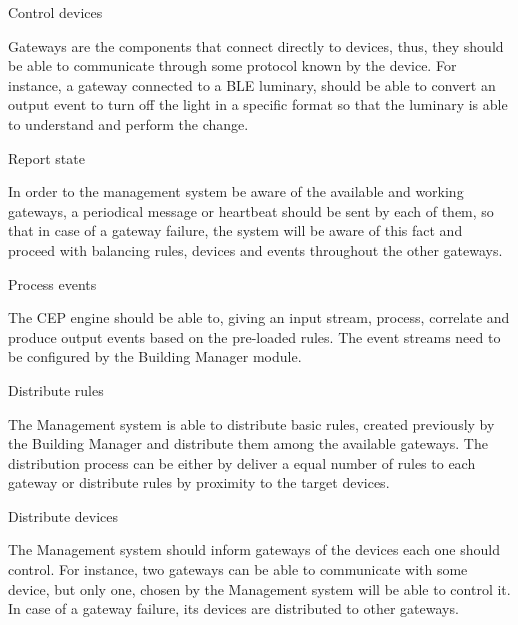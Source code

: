 \begin{Paragraph}{Control devices}
	
Gateways are the components that connect directly to devices, thus, they should be able to communicate through some protocol known by the device. For instance, a gateway connected to a BLE luminary, should be able to convert an output event to turn off the light in a specific format so that the luminary is able to understand and perform the change.
	
\end{Paragraph}

\begin{Paragraph}{Report state}
	
In order to the management system be aware of the available and working gateways, a periodical message or heartbeat should be sent by each of them, so that in case of a gateway failure, the system will be aware of this fact and proceed with balancing rules, devices and events throughout the other gateways.

\end{Paragraph}


\begin{Paragraph}{Process events}
	
The CEP engine should be able to, giving an input stream, process, correlate and produce output events based on the pre-loaded rules. The event streams need to be configured by the Building Manager module.

\end{Paragraph}


\begin{Paragraph}{Distribute rules}
	
The Management system is able to distribute basic rules, created previously by the Building Manager and distribute them among the available gateways. The distribution process can be either by deliver a equal number of rules to each gateway or distribute rules by proximity to the target devices.
	
\end{Paragraph}

\begin{Paragraph}{Distribute devices}
	
The Management system should inform gateways of the devices each one should control. For instance, two gateways can be able to communicate with some device, but only one, chosen by the Management system will be able to control it. In case of a gateway failure, its devices are distributed to other gateways.
	
\end{Paragraph}

